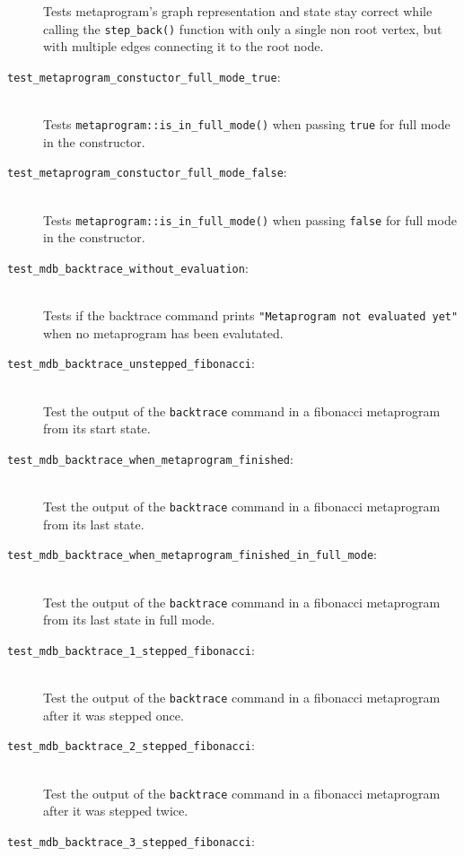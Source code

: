 \begin{description}
        Tests metaprogram's graph representation and state stay correct while
        calling the \texttt{step\_back()} function with only a single non root
        vertex, but with multiple edges connecting it to the root node.
    \item[\texttt{test\_metaprogram\_constuctor\_full\_mode\_true}:] \hfill \\
        Tests \texttt{metaprogram::is\_in\_full\_mode()} when passing
        \texttt{true} for full mode in the constructor.
    \item[\texttt{test\_metaprogram\_constuctor\_full\_mode\_false}:] \hfill \\
        Tests \texttt{metaprogram::is\_in\_full\_mode()} when passing
        \texttt{false} for full mode in the constructor.
    \item[\texttt{test\_mdb\_backtrace\_without\_evaluation}:] \hfill \\
        Tests if the backtrace command prints
        \texttt{"Metaprogram not evaluated yet"} when no metaprogram has been
        evalutated.
    \item[\texttt{test\_mdb\_backtrace\_unstepped\_fibonacci}:] \hfill \\
        Test the output of the \texttt{backtrace} command in a fibonacci
        metaprogram from its start state.
    \item[\texttt{test\_mdb\_backtrace\_when\_metaprogram\_finished}:] \hfill \\
        Test the output of the \texttt{backtrace} command in a fibonacci
        metaprogram from its last state.
    \item[\texttt{test\_mdb\_backtrace\_when\_metaprogram\_finished\_in\_full\_mode}:] \hfill \\
        Test the output of the \texttt{backtrace} command in a fibonacci
        metaprogram from its last state in full mode.
    \item[\texttt{test\_mdb\_backtrace\_1\_stepped\_fibonacci}:] \hfill \\
        Test the output of the \texttt{backtrace} command in a fibonacci
        metaprogram after it was stepped once.
    \item[\texttt{test\_mdb\_backtrace\_2\_stepped\_fibonacci}:] \hfill \\
        Test the output of the \texttt{backtrace} command in a fibonacci
        metaprogram after it was stepped twice.
    \item[\texttt{test\_mdb\_backtrace\_3\_stepped\_fibonacci}:] \hfill \\

\end{description}
